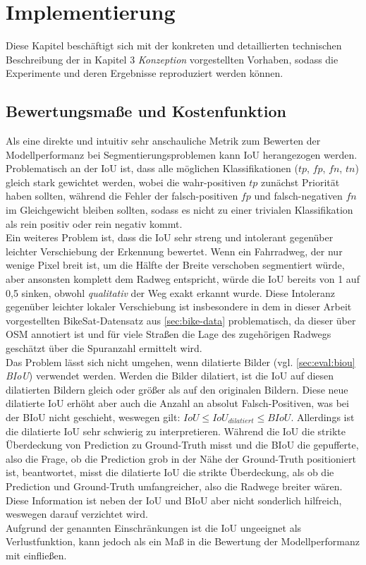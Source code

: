 \chapter{Implementierung} 

Diese Kapitel beschäftigt sich mit der konkreten und detaillierten technischen Beschreibung 
der in Kapitel 3 \textit{Konzeption} vorgestellten Vorhaben, sodass die Experimente und deren Ergebnisse 
reproduziert werden können.


\section{Bewertungsmaße und Kostenfunktion} \label{sec:eval}


Als eine direkte und intuitiv sehr anschauliche Metrik zum Bewerten der Modellperformanz bei Segmentierungsproblemen
kann \ac{IoU} herangezogen werden. \\ 
Problematisch an der \ac{IoU} ist, dass alle möglichen Klassifikationen ($tp$, $fp$, $fn$, $tn$)
gleich stark gewichtet werden, wobei die wahr-positiven $tp$ zunächst Priorität haben sollten, 
während die Fehler der falsch-positiven $fp$ und falsch-negativen $fn$ im Gleichgewicht bleiben sollten, 
sodass es nicht zu einer trivialen Klassifikation als rein positiv oder rein negativ kommt. \\
Ein weiteres Problem ist, dass die \ac{IoU} sehr streng und intolerant gegenüber leichter Verschiebung der Erkennung 
bewertet. Wenn ein Fahrradweg, der nur wenige Pixel breit ist, um die Hälfte der Breite verschoben segmentiert würde, 
aber ansonsten komplett dem Radweg entspricht, würde die \ac{IoU} bereits von 1 auf 0,5 sinken, obwohl \textit{qualitativ} 
der Weg exakt erkannt wurde. Diese Intoleranz gegenüber leichter lokaler Verschiebung ist insbesondere in dem 
in dieser Arbeit vorgestellten BikeSat-Datensatz aus \autoref{sec:bike-data} problematisch, 
da dieser über \ac{OSM} annotiert ist und für viele Straßen die Lage des zugehörigen Radwegs geschätzt über 
die Spuranzahl ermittelt wird. \\
Das Problem lässt sich nicht umgehen, wenn dilatierte Bilder (vgl. \autoref{sec:eval:biou} \textit{BIoU}) verwendet werden.
Werden die Bilder dilatiert, ist die IoU auf diesen dilatierten Bildern gleich oder größer als auf den originalen Bildern. 
Diese neue dilatierte IoU erhöht aber auch die Anzahl an absolut Falsch-Positiven, was bei der BIoU nicht geschieht, 
weswegen gilt: $IoU \leq IoU_{dilatiert} \leq BIoU$. Allerdings ist die dilatierte IoU sehr schwierig zu interpretieren.
Während die IoU die strikte Überdeckung von Prediction zu Ground-Truth misst und die BIoU die gepufferte, also 
die Frage, ob die Prediction grob in der Nähe der Ground-Truth positioniert ist, beantwortet, misst die dilatierte IoU die strikte 
Überdeckung, als ob die Prediction und Ground-Truth umfangreicher, also die Radwege breiter wären. 
Diese Information ist neben der IoU und BIoU aber nicht sonderlich hilfreich, weswegen darauf verzichtet wird. \\ 
Aufgrund der genannten Einschränkungen ist die \ac{IoU} ungeeignet als Verlustfunktion, kann jedoch als ein Maß 
in die Bewertung der Modellperformanz mit einfließen. 

